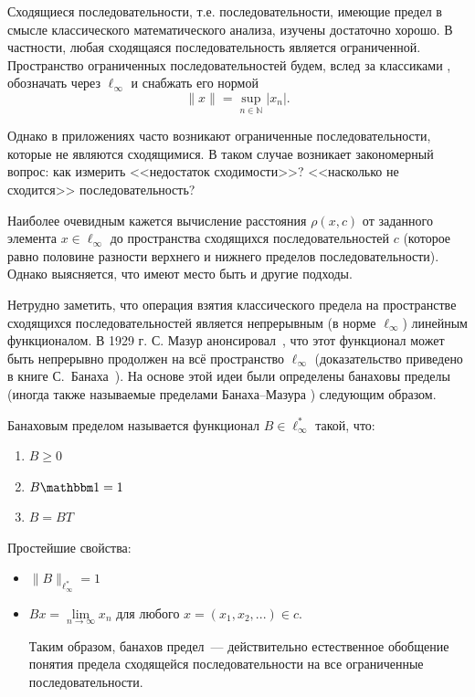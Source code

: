 Сходящиеся последовательности, т.е. последовательности, имеющие предел в смысле классического математического анализа,
изучены достаточно хорошо.
В частности, любая сходящаяся последовательность является ограниченной.
Пространство ограниченных последовательностей будем, вслед за классиками \cite{wojtaszczyk1996banach,lindenstrauss1973classical},
обозначать через $\ell_\infty$ и снабжать его нормой
\begin{equation*}
	\|x\| = \sup_{n\in\mathbb{N}}|x_n|
	.
\end{equation*}

Однако в приложениях часто возникают ограниченные последовательности,
которые не являются сходящимися.
В таком случае возникает закономерный вопрос:
как измерить <<недостаток сходимости>>?
<<насколько не сходится>> последовательность?

Наиболее очевидным кажется вычисление расстояния $\rho(x,c)$ от заданного элемента $x\in\ell_\infty$
до пространства сходящихся последовательностей $c$
(которое равно половине разности верхнего и нижнего пределов последовательности).
Однако выясняется, что имеют место быть и другие подходы.

Нетрудно заметить, что операция взятия классического предела на пространстве сходящихся последовательностей
является непрерывным (в норме $\ell_\infty$) линейным функционалом.
В 1929 г. С. Мазур анонсировал~\cite{Mazur},
что этот функционал может быть непрерывно продолжен на всё пространство $\ell_\infty$
(доказательство приведено в книге С.~Банаха~\cite{banach2001theory_rus}).
На основе этой идеи были определены банаховы пределы
(иногда также называемые пределами Банаха--Мазура \cite{alekhno2012superposition,alekhno2015banach})
следующим образом.

Банаховым пределом называется функционал $B\in \ell_\infty^*$ такой, что:
\begin{enumerate}
	\item
		$B \geqslant 0$
	\item
		$B\one = 1$
	\item
		$B=BT$
\end{enumerate}

Простейшие свойства:
\begin{itemize}
	\item
		$\|B\|_{\ell_\infty^*} = 1$
	\item
		$Bx = \lim\limits_{n\to\infty} x_n$ для любого $x=(x_1, x_2, ...) \in c$.

		Таким образом,
		банахов предел~--- действительно естественное обобщение понятия предела сходящейся последовательности
		на все ограниченные последовательности.
\end{itemize}

